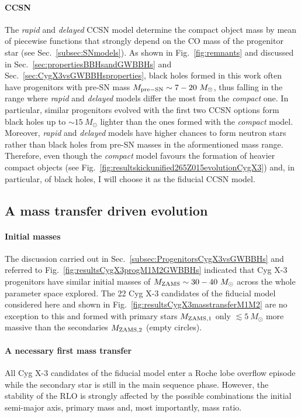 \documentclass[a4paper,titlepage]{book}     	%
\newcommand{\sun}{\ensuremath{_\odot}}
\newcommand{\msun}{\ensuremath{M\sun}}
\begin{document}
\paragraph{CCSN} The \emph{rapid} and \emph{delayed} CCSN model determine the compact object mass by mean of piecewise functions that strongly depend on the CO mass of the progenitor star (see Sec.\ \ref{subsec:SNmodels}). As shown in Fig.\ \ref{fig:remnants} and discussed in Sec.\ \ref{sec:propertiesBBHsandGWBBHs} and Sec.\ \ref{sec:CygX3vsGWBBHsproperties}, black holes formed in this work often have progenitors with pre-SN mass $M_{\rm pre-SN} \sim 7-20~\msun$, thus falling in the range where \emph{rapid} and \emph{delayed} models differ the most from the \emph{compact} one. In particular, similar progenitors evolved with the first two CCSN options form black holes up to $\sim 15~\msun$ lighter than the ones formed with the \emph{compact} model. Moreover, \emph{rapid} and \emph{delayed} models have higher chances to form neutron stars rather than black holes from pre-SN masses in the aformentioned mass range. Therefore, even though the \emph{compact} model favours the formation of heavier compact objects (see Fig.\ \ref{fig:resultskickunified265Z015evolutionCygX3}) and, in particular, of black holes, I will choose it as the fiducial CCSN model.






\subsection{A mass transfer driven evolution}\label{subsec:CygX3masstransferdrivenevo}
\paragraph{Initial masses} The discussion carried out in Sec.\ \ref{subsec:ProgenitorsCygX3vsGWBBHs} and referred to Fig.\ \ref{fig:resultsCygX3progM1M2GWBBHs} indicated that Cyg X-3 progenitors have similar initial masses of $M_{\rm ZAMS} \sim 30-40~\msun$ across the whole parameter space explored. The 22 Cyg X-3 candidates of the fiducial model considered here and shown in Fig.\ \ref{fig:resultsCygX3masstransferM1M2} are no exception to this and formed with primary stars $M_{\rm ZAMS,1}$ only $\lesssim 5~\msun$ more massive than the secondaries $M_{\rm ZAMS,2}$ (empty circles).

\paragraph{A necessary first mass transfer} All Cyg X-3 candidates of the fiducial model enter a Roche lobe overflow episode while the secondary star is still in the main sequence phase. However, the stability of the RLO is strongly affected by the possible combinations the initial semi-major axis, primary mass and, most importantly, mass ratio.\\
\end{document}
